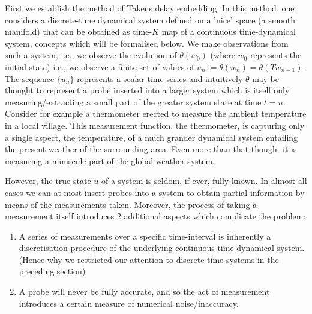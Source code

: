 \documentclass[a4paper,12pt,twoside]{report}
\begin{document}
First we establish the method of Takens delay embedding. 
In this method, one considers a discrete-time dynamical system defined on a 'nice' space (a smooth manifold) that can be obtained as time-$K$ map of a continuous time-dynamical system, concepts which will be formalised below.
We make observations from such a system, i.e., we observe the evolution of $\theta(w_0)$ (where $w_0$ represents the initial state) i.e., we observe  a finite set of values of $u_n :=  \theta(w_n) = \theta(Tw_{n-1})$. The sequence $\{u_n\}$ represents a scalar time-series and intuitively $\theta$ may be thought to represent a probe inserted into a larger system which is itself only measuring/extracting a small part of the greater system state at time $t=n$. 
Consider for example a thermometer erected to measure the ambient temperature in a local village. This measurement function, the thermometer, is capturing only a single aspect, the temperature, of a much grander dynamical system entailing the present weather of the surrounding area. Even more than that though- it is measuring a miniscule part of the global weather system. 



However, the true state $u$ of a system is seldom, if ever, fully known. In almost all cases we can at most insert probes into a system to obtain partial information by means of the measurements taken. Moreover, the process of taking a measurement itself introduces 2 additional aspects which complicate the problem: 
\vspace{-8mm}
\begin{enumerate}[noitemsep, label=\roman*.]
  \item A series of measurements over a specific time-interval is inherently a discretisation procedure of the underlying continuous-time dynamical system. (Hence why we restricted our attention to discrete-time systems in the preceding section)
  \item A probe will never be fully accurate, and so the act of measurement introduces a certain measure of numerical noise/inaccuracy.
\end{enumerate}
\end{document}
